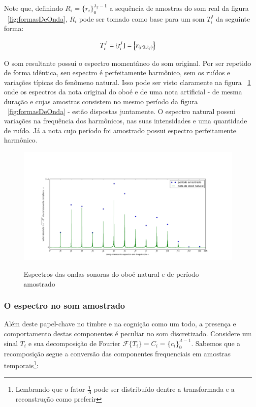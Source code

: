 Note que, definindo $ R_i=\{ r_i \}_0^{\lambda_f-1}$ a sequência de amostras do som real da figura ~\ref{fig:formasDeOnda},
$R_i$ pode ser tomado como base para um som $T_i^f$ da seguinte forma: 

\begin{equation}\label{sampleandoFormaDeOnda}
     T^f_i=\{ t_i^f \}=\Bigl\{ r_{(i\,\%\lambda_{f})} \Bigr\}
\end{equation}

O som resultante possui o espectro momentâneo do som original. Por ser repetido de forma idêntica,
seu espectro é perfeitamente harmônico, sem os ruídos e variações típicas do fenômeno natural. Isso pode ser visto claramente na figura ~\ref{fig:espectroOboe} onde os espectros da nota original do oboé e de uma nota 
artificial - de mesma duração e cujas amostras consistem no mesmo período da figura ~\ref{fig:formasDeOnda} - estão dispostas juntamente. O espectro natural possui variações na frequência dos harmônicos, nas suas intensidades e uma quantidade de ruído. Já a nota cujo período foi amostrado possui espectro perfeitamente harmônico.



\begin{figure}[h!]
    \centering
    \caption{Espectros das ondas sonoras do oboé natural e de período amostrado}
        \includegraphics[width=\textwidth]{figuras/espectroOboeAmostradoNatural2}
        \label{fig:espectroOboe}
\end{figure}





\subsubsection{O espectro no som amostrado}
Além deste papel-chave no timbre e na cognição como um todo, a presença e comportamento destas componentes é peculiar no som discretizado. Considere um sinal $T_i$ e sua decomposição de Fourier $\mathcal{F}\{T_i\}=C_i=\{c_i\}_0^{\Lambda-1}$. Sabemos que a recomposição segue a conversão das componentes frequenciais em amostras temporais\footnote{Lembrando que o fator $\frac{1}{\Lambda}$ pode ser distribuído dentre a transformada e a reconstrução como preferir}:

